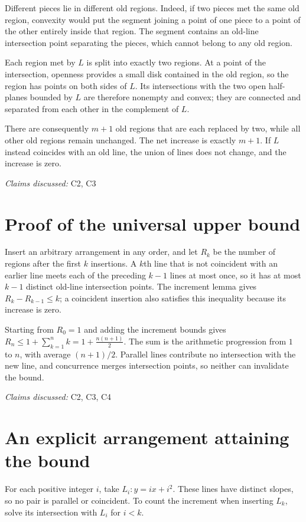 \documentclass[11pt]{article}
\begin{document}
Different pieces lie in different old regions. Indeed, if two pieces met the same old region, convexity would put the segment joining a point of one piece to a point of the other entirely inside that region. The segment contains an old-line intersection point separating the pieces, which cannot belong to any old region.

Each region met by $L$ is split into exactly two regions. At a point of the intersection, openness provides a small disk contained in the old region, so the region has points on both sides of $L$. Its intersections with the two open half-planes bounded by $L$ are therefore nonempty and convex; they are connected and separated from each other in the complement of $L$.

There are consequently $m+1$ old regions that are each replaced by two, while all other old regions remain unchanged. The net increase is exactly $m+1$. If $L$ instead coincides with an old line, the union of lines does not change, and the increase is zero.

\textit{Claims discussed: }C2, C3
\section{Proof of the universal upper bound}
Insert an arbitrary arrangement in any order, and let $R_k$ be the number of regions after the first $k$ insertions. A $k$th line that is not coincident with an earlier line meets each of the preceding $k-1$ lines at most once, so it has at most $k-1$ distinct old-line intersection points. The increment lemma gives $R_k-R_{k-1}\leq k$; a coincident insertion also satisfies this inequality because its increase is zero.

Starting from $R_0=1$ and adding the increment bounds gives
$R_n\leq 1+\sum_{k=1}^{n}k=1+\frac{n(n+1)}{2}$. The sum is the arithmetic progression from $1$ to $n$, with average $(n+1)/2$. Parallel lines contribute no intersection with the new line, and concurrence merges intersection points, so neither can invalidate the bound.

\textit{Claims discussed: }C2, C3, C4
\section{An explicit arrangement attaining the bound}
For each positive integer $i$, take $L_i: y=ix+i^2$. These lines have distinct slopes, so no pair is parallel or coincident. To count the increment when inserting $L_k$, solve its intersection with $L_i$ for $i<k$.
\end{document}
